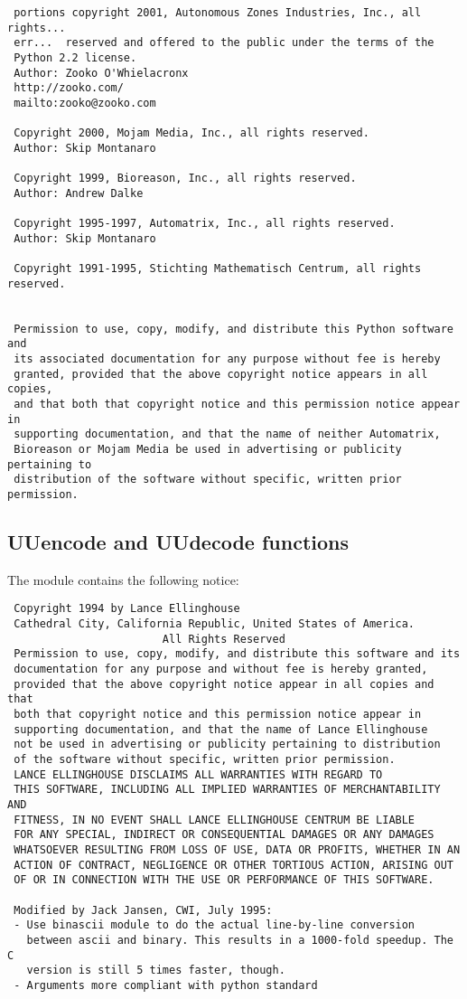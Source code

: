 \begin{verbatim}
 portions copyright 2001, Autonomous Zones Industries, Inc., all rights...
 err...  reserved and offered to the public under the terms of the
 Python 2.2 license.
 Author: Zooko O'Whielacronx
 http://zooko.com/
 mailto:zooko@zooko.com

 Copyright 2000, Mojam Media, Inc., all rights reserved.
 Author: Skip Montanaro

 Copyright 1999, Bioreason, Inc., all rights reserved.
 Author: Andrew Dalke

 Copyright 1995-1997, Automatrix, Inc., all rights reserved.
 Author: Skip Montanaro

 Copyright 1991-1995, Stichting Mathematisch Centrum, all rights reserved.


 Permission to use, copy, modify, and distribute this Python software and
 its associated documentation for any purpose without fee is hereby
 granted, provided that the above copyright notice appears in all copies,
 and that both that copyright notice and this permission notice appear in
 supporting documentation, and that the name of neither Automatrix,
 Bioreason or Mojam Media be used in advertising or publicity pertaining to
 distribution of the software without specific, written prior permission.
\end{verbatim} 



\subsection{UUencode and UUdecode functions}

The  module contains the following notice:

\begin{verbatim}
 Copyright 1994 by Lance Ellinghouse
 Cathedral City, California Republic, United States of America.
                        All Rights Reserved
 Permission to use, copy, modify, and distribute this software and its
 documentation for any purpose and without fee is hereby granted,
 provided that the above copyright notice appear in all copies and that
 both that copyright notice and this permission notice appear in
 supporting documentation, and that the name of Lance Ellinghouse
 not be used in advertising or publicity pertaining to distribution
 of the software without specific, written prior permission.
 LANCE ELLINGHOUSE DISCLAIMS ALL WARRANTIES WITH REGARD TO
 THIS SOFTWARE, INCLUDING ALL IMPLIED WARRANTIES OF MERCHANTABILITY AND
 FITNESS, IN NO EVENT SHALL LANCE ELLINGHOUSE CENTRUM BE LIABLE
 FOR ANY SPECIAL, INDIRECT OR CONSEQUENTIAL DAMAGES OR ANY DAMAGES
 WHATSOEVER RESULTING FROM LOSS OF USE, DATA OR PROFITS, WHETHER IN AN
 ACTION OF CONTRACT, NEGLIGENCE OR OTHER TORTIOUS ACTION, ARISING OUT
 OF OR IN CONNECTION WITH THE USE OR PERFORMANCE OF THIS SOFTWARE.

 Modified by Jack Jansen, CWI, July 1995:
 - Use binascii module to do the actual line-by-line conversion
   between ascii and binary. This results in a 1000-fold speedup. The C
   version is still 5 times faster, though.
 - Arguments more compliant with python standard
\end{verbatim}



